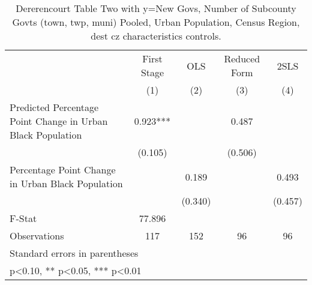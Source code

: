 \begin{table}[htbp]\centering
\def\sym#1{\ifmmode^{#1}\else\(^{#1}\)\fi}
\caption{Dererencourt Table Two with y=New Govs, Number of Subcounty Govts (town, twp, muni)  Pooled, Urban Population, Census Region, dest cz characteristics controls.}
\begin{tabular}{l*{4}{c}}
\toprule
                    & First Stage   &         OLS   &Reduced Form   &        2SLS   \\
                    &\multicolumn{1}{c}{(1)}   &\multicolumn{1}{c}{(2)}   &\multicolumn{1}{c}{(3)}   &\multicolumn{1}{c}{(4)}   \\
\midrule
Predicted Percentage Point Change in Urban Black Population&       0.923***&               &       0.487   &               \\
                    &     (0.105)   &               &     (0.506)   &               \\
\addlinespace
Percentage Point Change in Urban Black Population&               &       0.189   &               &       0.493   \\
                    &               &     (0.340)   &               &     (0.457)   \\
\midrule
F-Stat              &      77.896   &               &               &               \\
Observations        &         117   &         152   &          96   &          96   \\
\bottomrule
\multicolumn{5}{l}{\footnotesize Standard errors in parentheses}\\
\multicolumn{5}{l}{\footnotesize * p<0.10, ** p<0.05, *** p<0.01}\\
\end{tabular}
\end{table}
